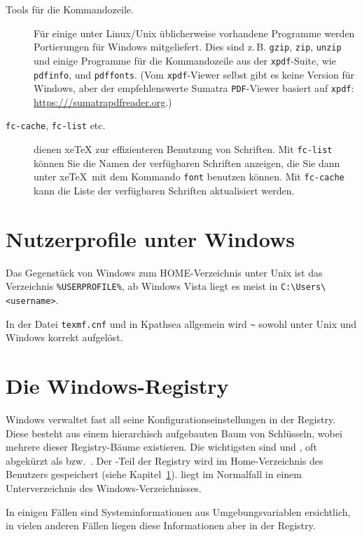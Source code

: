 \documentclass[12pt,ngerman,a4paper,fullparskip]{scrreprt}
\newcommand{\acro}[1]{\texttt{#1}}
\newcommand{\cmdname}[1]{\texttt{#1}}
\newcommand{\prog}[1]{\texttt{#1}}
\newcommand{\filename}[1]{\texttt{#1}}
\newcommand{\KPS}{Kpathsea\xspace}
\providecommand*{\XeTeX}{xe\TeX\xspace}
\begin{document}
\begin{description}
\item[Tools für die Kommandozeile.] Für einige unter Linux/Unix üblicherweise vorhandene Programme werden Portierungen für Windows mitgeliefert. Dies sind z.\,B. \cmdname{gzip}, \cmdname{zip}, \cmdname{unzip} und einige Programme für die Kommandozeile aus der
   \cmdname{xpdf}-Suite, wie \cmdname{pdfinfo}, und \cmdname{pdffonts}.  (Vom
   \cmdname{xpdf}-Viewer selbst gibt es keine Version für Windows, aber der empfehlenswerte 
   Sumatra \acro{PDF}-Viewer basiert auf \cmdname{xpdf}:
   \url{https:///sumatrapdfreader.org}.)
 \item[\texttt{fc-cache}, \texttt{fc-list} etc.] dienen \XeTeX{} zur effizienteren Benutzung von Schriften. Mit \prog{fc-list} können Sie die Namen der
   verfügbaren Schriften anzeigen, die Sie dann unter \XeTeX\ mit dem
   Kommando \texttt{font} benutzen können. Mit \prog{fc-cache} kann die Liste
   der verfügbaren Schriften aktualisiert werden.
\end{description}


\section{Nutzerprofile unter Windows}
\label{sec:winhome}

Das Gegenstück von Windows zum HOME-Verzeichnis unter Unix ist das
Verzeichnis \verb|%USERPROFILE%|, ab Windows Vista liegt es meist in \verb|C:\Users\<username>|.

In der Datei  \filename{texmf.cnf} und in \KPS{} allgemein wird \verb|~| 
sowohl unter Unix und Windows korrekt aufgelöst.

\section{Die Windows-Registry}
\label{sec:registry}

Windows verwaltet fast all seine Konfigurationseinstellungen in der Registry. Diese besteht aus einem hierarchisch aufgebauten Baum von Schlüsseln, wobei mehrere dieser Registry-Bäume existieren. Die wichtigsten sind  und , oft abgekürzt als  bzw.\ . Der -Teil der Registry wird im Home-Verzeichnis des Benutzers gespeichert (siehe Kapitel~\ref{sec:winhome}).  liegt im
Normalfall in einem Unterverzeichnis des Windows-Verzeichnisses.

In einigen Fällen sind Systeminformationen aus Umgebungsvariablen ersichtlich, in vielen anderen Fällen liegen diese Informationen aber in der Registry.
\end{document}

